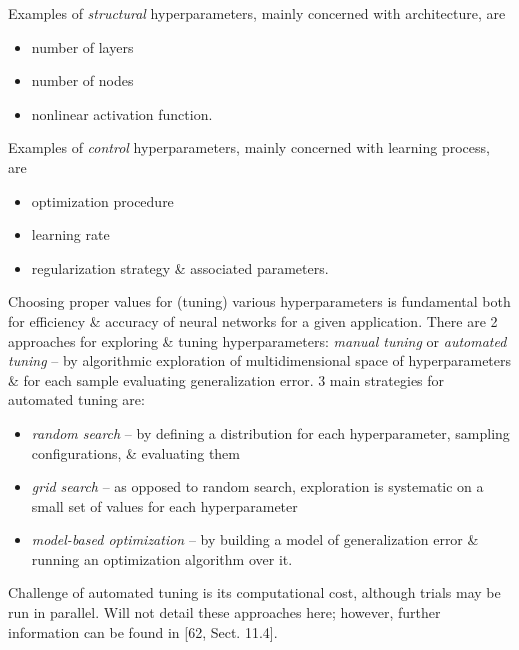 \documentclass{article}
\begin{document}
\begin{itemize}
\begin{itemize}
\begin{itemize}
			Examples of {\it structural} hyperparameters, mainly concerned with architecture, are
			\begin{itemize}
				\item number of layers
				\item number of nodes
				\item nonlinear activation function.
			\end{itemize}
			Examples of {\it control} hyperparameters, mainly concerned with learning process, are
			\begin{itemize}
				\item optimization procedure
				\item learning rate
				\item regularization strategy \& associated parameters.
			\end{itemize}
			Choosing proper values for (tuning) various hyperparameters is fundamental both for efficiency \& accuracy of neural networks for a given application. There are 2 approaches for exploring \& tuning hyperparameters: {\it manual tuning} or {\it automated tuning} -- by algorithmic exploration of multidimensional space of hyperparameters \& for each sample evaluating generalization error. 3 main strategies for automated tuning are:
			\begin{itemize}
				\item {\it random search} -- by defining a distribution for each hyperparameter, sampling configurations, \& evaluating them
				\item {\it grid search} -- as opposed to random search, exploration is systematic on a small set of values for each hyperparameter
				\item {\it model-based optimization} -- by building a model of generalization error \& running an optimization algorithm over it.
			\end{itemize}
			Challenge of automated tuning is its computational cost, although trials may be run in parallel. Will not detail these approaches here; however, further information can be found in [62, Sect. 11.4].


\end{itemize}
\end{itemize}
\end{itemize}
\end{document}
